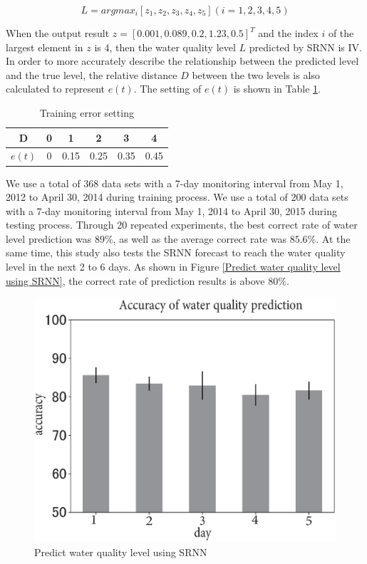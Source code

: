 \documentclass[runningheads]{llncs}
\begin{document}
\begin{equation}
L=argmax_i[z_1,z_2,z_3,z_4,z_5 ](i=1,2,3,4,5)
\end{equation}

When the output result $z = [0.001, 0.089, 0.2, 1.23, 0.5]^T$ and the index $i$ of 
the largest element in $z$ is 4, then the water quality level $L$ predicted by SRNN is IV. 
In order to more accurately describe the relationship between the predicted 
level and the true level, the relative distance $D$ between the two levels 
is also calculated to represent $e(t)$. The setting of $e(t)$ is shown in Table \ref{Training error setting}.
\begin{table}[htbp] 
\centering
\caption{Training error setting}
\label{Training error setting}
\begin{tabular}{cccccc} 
\toprule 
D&0&1&2&3&4\\ 
\midrule 
$e(t)$&0&0.15&0.25&0.35&0.45\\ 
\bottomrule 
\end{tabular} 
\end{table}

We use a total of 368 data sets with a 7-day monitoring interval from May 1,
2012 to April 30, 2014 during training process. We use a total of 200 data sets with a 
7-day monitoring interval from May 1, 2014 to April 30, 2015 during testing process. 
Through 20 repeated experiments, the best correct rate of water level prediction was $89\%$,
as well as the average correct rate was $85.6\%$. At the same time, 
this study also tests the SRNN forecast to reach the water quality
level in the next 2 to 6 days.  As shown in Figure \ref{Predict water 
quality level using SRNN}, the correct rate of prediction results is above $80\%$.

\begin{figure}[htbp]
\centering
\includegraphics[width=\columnwidth]{Predict_water_quality}
\caption{Predict water quality level using SRNN}
\label{Predict water quality level using SRNN}
\end{figure}
\end{document}
